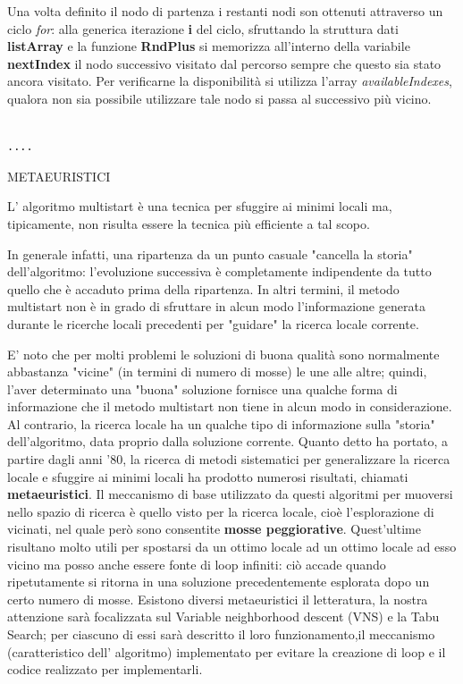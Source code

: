 \documentclass[11pt]{article}
\begin{document}
Una volta definito il nodo di partenza i restanti nodi son ottenuti attraverso un ciclo \textit{for}: alla generica iterazione \textbf{i} del ciclo, sfruttando la struttura dati \textbf{listArray} e la funzione \textbf{RndPlus} si memorizza all'interno della variabile \textbf{nextIndex} il nodo successivo visitato dal percorso sempre che questo sia stato ancora visitato. Per verificarne la disponibilità si utilizza l'array \textit{availableIndexes}, qualora non sia possibile utilizzare tale nodo si passa al successivo più vicino.


\begin{lstlisting}

....
\end{lstlisting}


\vspace{2\baselineskip}
METAEURISTICI
\vspace{2\baselineskip}

L' algoritmo multistart è una tecnica per sfuggire ai minimi locali ma, tipicamente, non risulta essere la tecnica più efficiente a tal scopo. 

In generale infatti, una ripartenza da un punto casuale "cancella la storia" dell'algoritmo: l'evoluzione successiva è completamente indipendente da tutto quello che è accaduto prima della ripartenza. In altri termini, il metodo multistart non è in grado di sfruttare in alcun modo l'informazione generata durante le ricerche locali precedenti per "guidare" la ricerca locale corrente. 

E' noto che per molti problemi le soluzioni di buona qualità sono normalmente abbastanza  "vicine" (in termini di numero di mosse) le une alle altre; quindi, l'aver determinato una "buona" soluzione fornisce una qualche forma di informazione che il metodo multistart non tiene in alcun modo in considerazione. Al contrario, la ricerca locale ha un qualche tipo di informazione sulla "storia" dell'algoritmo, data proprio dalla soluzione corrente. 
Quanto detto ha portato, a partire dagli anni '80, la ricerca di metodi sistematici per generalizzare la ricerca locale e sfuggire ai minimi locali ha prodotto numerosi risultati, chiamati \textbf{metaeuristici}. 
Il meccanismo di base utilizzato da questi algoritmi per muoversi nello spazio di ricerca è quello visto per la ricerca locale, cioè l'esplorazione di vicinati, nel quale però sono consentite\textbf{ mosse peggiorative}.
Quest'ultime risultano molto utili per spostarsi da un ottimo locale ad un ottimo locale ad esso vicino ma posso anche essere fonte di loop infiniti: ciò accade quando ripetutamente si ritorna in una soluzione precedentemente esplorata dopo un certo numero di mosse. 
Esistono diversi metaeuristici il letteratura, la nostra attenzione sarà focalizzata sul Variable neighborhood descent (VNS) e la Tabu Search; per ciascuno di essi sarà descritto il loro funzionamento,il meccanismo (caratteristico dell' algoritmo) implementato per evitare la creazione di loop e il codice realizzato per implementarli.
\end{document}
